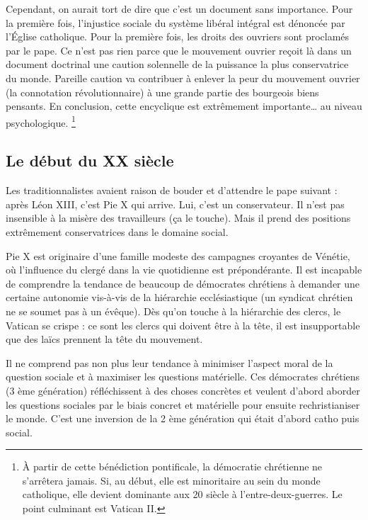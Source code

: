 \documentclass[12pt]{report}
\begin{document}
Cependant, on aurait tort de dire que c’est un document sans importance. 
Pour la première fois, l’injustice sociale du système libéral intégral est dénoncée par l’Église catholique. 
Pour la première fois, les droits des ouvriers sont proclamés par le pape. 
Ce n'est pas rien parce que le mouvement ouvrier reçoit là dans un document doctrinal une caution solennelle de la puissance la plus conservatrice du monde. 
Pareille caution va contribuer à enlever la peur du mouvement ouvrier (la connotation révolutionnaire) à une grande partie des bourgeois biens pensants. 
En conclusion, cette encyclique est extrêmement importante… au niveau psychologique.
\footnote{À partir de cette bénédiction pontificale, la démocratie chrétienne ne s'arrêtera jamais. Si, au début, elle est minoritaire au sein du monde catholique, elle devient dominante aux 20 siècle à l'entre-deux-guerres. Le point culminant est Vatican II.}


\subsection{Le début du XX siècle}

Les traditionnalistes avaient raison de bouder et d'attendre le pape suivant : après Léon XIII, c'est Pie X qui arrive. Lui, c'est un conservateur. Il n'est pas insensible à la misère des travailleurs (ça le touche). Mais il prend des positions extrêmement conservatrices dans le domaine social.

Pie X est originaire d'une famille modeste des campagnes croyantes de Vénétie, où l'influence du clergé dans la vie quotidienne est prépondérante.
Il est incapable de comprendre la tendance de beaucoup de démocrates chrétiens à demander une certaine autonomie vis-à-vis de la hiérarchie ecclésiastique (un syndicat chrétien ne se soumet pas à un évêque).
Dès qu'on touche à la hiérarchie des clercs, le Vatican se crispe : ce sont les clercs qui doivent être à la tête, il est insupportable que des laïcs prennent la tête du mouvement.

Il ne comprend pas non plus leur tendance à minimiser l'aspect moral de la question sociale et à maximiser les questions matérielle.
Ces démocrates chrétiens (3 ème génération) réfléchissent à des choses concrètes et veulent d’abord aborder les questions sociales par le biais concret et matérielle pour ensuite rechristianiser le monde.
C’est une inversion de la 2 ème génération qui était d’abord catho puis social.
\end{document}
